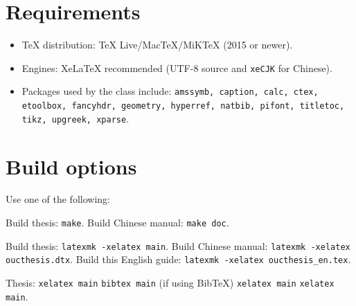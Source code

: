 \documentclass[12pt]{article}
\begin{document}
\section{Requirements}
\begin{itemize}[leftmargin=1.5em]
  \item TeX distribution: TeX Live/MacTeX/MiKTeX (2015 or newer).
  \item Engines: XeLaTeX recommended (UTF-8 source and \texttt{xeCJK} for Chinese).
  \item Packages used by the class include: \texttt{amssymb, caption, calc, ctex, etoolbox, fancyhdr, geometry, hyperref, natbib, pifont, titletoc, tikz, upgreek, xparse}.
\end{itemize}

\section{Build options}
Use one of the following:
\begin{description}[leftmargin=1.7em,labelsep=0.5em]
  \item[GNU make] Build thesis: \lstinline|make|. Build Chinese manual: \lstinline|make doc|.
  \item[latexmk] Build thesis: \lstinline|latexmk -xelatex main|. Build Chinese manual: \lstinline|latexmk -xelatex oucthesis.dtx|. Build this English guide: \lstinline|latexmk -xelatex oucthesis_en.tex|.
  \item[Manual] Thesis: \lstinline|xelatex main| \textrightarrow{} \lstinline|bibtex main| (if using Bib\TeX) \textrightarrow{} \lstinline|xelatex main| \textrightarrow{} \lstinline|xelatex main|.
\end{description}
\end{document}
